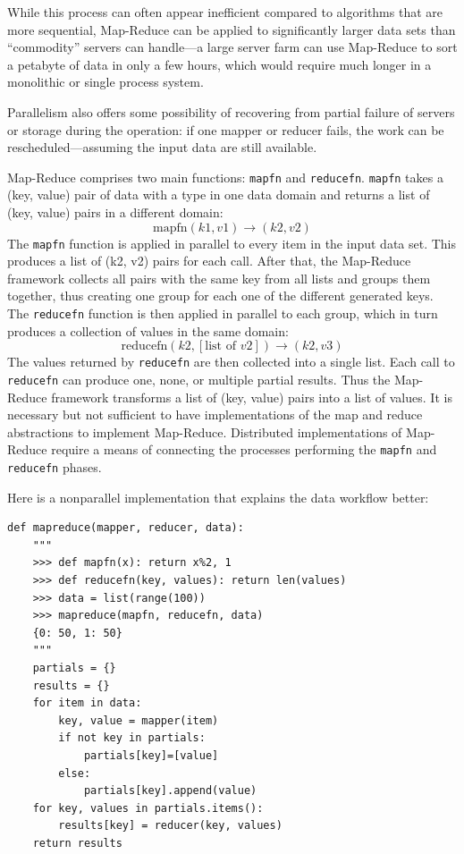\documentclass[justified, sixbynine]{tufte-book}
\def\ft{\small\tt}
\theoremstyle{plain}%
\newtheorem * {corollary}{Corollary}
\theoremstyle{definition}
\theoremstyle{remark}
\newtheorem * {remark}{Remark}
\newtheorem * {note}{Note}
\begin{document}
\begin{fullwidth}
While this process can often appear inefficient compared to algorithms that are more sequential, Map-Reduce can be applied to significantly larger data sets than ``commodity'' servers can handle---a large server farm can use Map-Reduce to sort a petabyte of data in only a few hours, which would require much longer in a monolithic or single process system.

Parallelism also offers some possibility of recovering from partial failure of servers or storage during the operation: if one mapper or reducer fails, the work can be rescheduled---assuming the input data are still available.

Map-Reduce comprises two main functions: {\ft mapfn} and {\ft reducefn}. {\ft mapfn} takes a (key, value) pair of data with a type in one data domain and returns a list of (key, value) pairs in a different domain:
\begin{equation}
\textrm{mapfn}(k1, v1) \rightarrow (k2, v2)
\end{equation}
The {\ft mapfn} function is applied in parallel to every item in the input data set. This produces a list of (k2, v2) pairs for each call. After that, the Map-Reduce framework collects all pairs with the same key from all lists and groups them together, thus creating one group for each one of the different generated keys.
The {\ft reducefn} function is then applied in parallel to each group, which in turn produces a collection of values in the same domain:
\begin{equation}
\textrm{reducefn}(k2, [\textrm{list of }v2]) \rightarrow (k2, v3)
\end{equation}
The values returned by {\ft reducefn} are then collected into a single list. Each call to {\ft reducefn} can produce one, none, or multiple partial results.
Thus the Map-Reduce framework transforms a list of (key, value) pairs into a list of values.
It is necessary but not sufficient to have implementations of the map and reduce abstractions to implement Map-Reduce. Distributed implementations of Map-Reduce require a means of connecting the processes performing the {\ft mapfn} and {\ft reducefn} phases.

Here is a nonparallel implementation that explains the data workflow better:

\begin{lstlisting}
def mapreduce(mapper, reducer, data):
    """
    >>> def mapfn(x): return x%2, 1
    >>> def reducefn(key, values): return len(values)
    >>> data = list(range(100))
    >>> mapreduce(mapfn, reducefn, data)
    {0: 50, 1: 50}
    """
    partials = {}
    results = {}
    for item in data:
        key, value = mapper(item)
        if not key in partials:
            partials[key]=[value]
        else:
            partials[key].append(value)
    for key, values in partials.items():
        results[key] = reducer(key, values)
    return results
\end{lstlisting}


\end{fullwidth}
\end{document}
